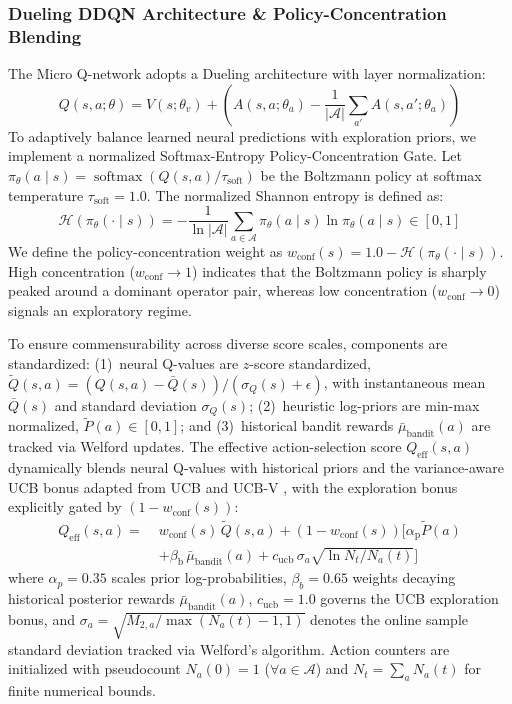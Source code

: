 \documentclass{ieeeaccess}
\begin{document}
\subsubsection{Dueling DDQN Architecture \& Policy-Concentration Blending}
The Micro Q-network adopts a Dueling architecture \cite{wang2016dueling} with layer normalization:
\begin{equation}
  Q(s, a; \theta) = V(s; \theta_v) + \left( A(s, a; \theta_a) - \frac{1}{|\mathcal{A}|} \sum_{a'} A(s, a'; \theta_a) \right)
  \label{eq:dueling_q}
\end{equation}
To adaptively balance learned neural predictions with exploration priors, we implement a normalized Softmax-Entropy Policy-Concentration Gate. Let $\pi_{\theta}(a \mid s) = \operatorname{softmax}(Q(s, a)/\tau_{\text{soft}})$ be the Boltzmann policy at softmax temperature $\tau_{\text{soft}} = 1.0$. The normalized Shannon entropy is defined as:
\begin{equation}
  \mathcal{H}(\pi_{\theta}(\cdot \mid s)) = -\frac{1}{\ln |\mathcal{A}|} \sum_{a \in \mathcal{A}} \pi_{\theta}(a \mid s) \ln \pi_{\theta}(a \mid s) \in [0, 1]
  \label{eq:policy_entropy}
\end{equation}
We define the policy-concentration weight as $w_{\text{conf}}(s) = 1.0 - \mathcal{H}(\pi_{\theta}(\cdot \mid s))$. High concentration ($w_{\text{conf}} \to 1$) indicates that the Boltzmann policy is sharply peaked around a dominant operator pair, whereas low concentration ($w_{\text{conf}} \to 0$) signals an exploratory regime. 

To ensure commensurability across diverse score scales, components are standardized: (1)~neural Q-values are $z$-score standardized, $\tilde{Q}(s, a) = (Q(s, a) - \bar{Q}(s))/(\sigma_Q(s) + \epsilon)$, with instantaneous mean $\bar{Q}(s)$ and standard deviation $\sigma_Q(s)$; (2)~heuristic log-priors are min-max normalized, $\tilde{P}(a) \in [0, 1]$; and (3)~historical bandit rewards $\bar{\mu}_{\text{bandit}}(a)$ are tracked via Welford updates.
The effective action-selection score $Q_{\text{eff}}(s, a)$ dynamically blends neural Q-values with historical priors and the variance-aware UCB bonus adapted from UCB \cite{auer2002finite} and UCB-V \cite{audibert2009exploration}, with the exploration bonus explicitly gated by $(1 - w_{\text{conf}}(s))$:
\begin{align}
  Q_{\text{eff}}(s, a) = \; &w_{\text{conf}}(s)\,\tilde{Q}(s, a) + (1 - w_{\text{conf}}(s))\Big[ \alpha_{\text{p}}\tilde{P}(a) \nonumber \\
  &+ \beta_{\text{b}}\,\bar{\mu}_{\text{bandit}}(a) + c_{\text{ucb}}\,\sigma_a \sqrt{\ln N_t / N_a(t)} \Big]
  \label{eq:q_eff_blending}
\end{align}
where $\alpha_p = 0.35$ scales prior log-probabilities, $\beta_b = 0.65$ weights decaying historical posterior rewards $\bar{\mu}_{\text{bandit}}(a)$, $c_{\text{ucb}} = 1.0$ governs the UCB exploration bonus, and $\sigma_a = \sqrt{M_{2, a}/\max(N_a(t) - 1, 1)}$ denotes the online sample standard deviation tracked via Welford's algorithm. Action counters are initialized with pseudocount $N_a(0) = 1$ ($\forall a \in \mathcal{A}$) and $N_t = \sum_a N_a(t)$ for finite numerical bounds.
\end{document}
